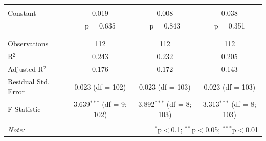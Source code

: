 \begin{table}[!htbp]
\begin{tabular}{@{\extracolsep{5pt}}lccc}
  & & & \\ 
 Constant & 0.019 & 0.008 & 0.038 \\ 
  & p = 0.635 & p = 0.843 & p = 0.351 \\ 
  & & & \\ 
\hline \\[-1.8ex] 
Observations & 112 & 112 & 112 \\ 
R$^{2}$ & 0.243 & 0.232 & 0.205 \\ 
Adjusted R$^{2}$ & 0.176 & 0.172 & 0.143 \\ 
Residual Std. Error & 0.023 (df = 102) & 0.023 (df = 103) & 0.023 (df = 103) \\ 
F Statistic & 3.639$^{***}$ (df = 9; 102) & 3.892$^{***}$ (df = 8; 103) & 3.313$^{***}$ (df = 8; 103) \\ 
\hline 
\hline \\[-1.8ex] 
\textit{Note:}  & \multicolumn{3}{r}{$^{*}$p$<$0.1; $^{**}$p$<$0.05; $^{***}$p$<$0.01} \\ 
\end{tabular} 
\end{table}



